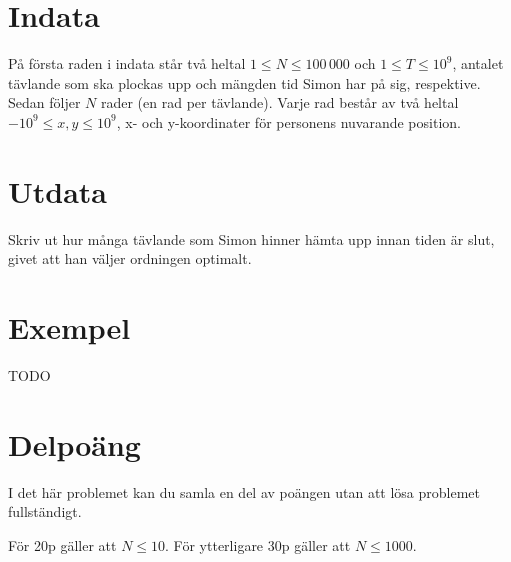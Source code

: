 \section*{Indata}
På första raden i indata står två heltal $1 \leq N \leq 100\,000$ och $1 \leq T \leq 10^9$, antalet tävlande som ska plockas upp och mängden tid Simon har på sig, respektive. Sedan följer $N$ rader (en rad per tävlande). Varje rad består av två heltal $-10^9 \leq x, y \leq 10^9$, x- och y-koordinater för personens nuvarande position.

\section*{Utdata}
Skriv ut hur många tävlande som Simon hinner hämta upp innan tiden är slut, givet att han väljer ordningen optimalt.

\section*{Exempel}
TODO

\section*{Delpoäng}
I det här problemet kan du samla en del av poängen utan att lösa problemet fullständigt.

För 20p gäller att $N \leq 10$. För ytterligare 30p gäller att $N \leq 1000$.

